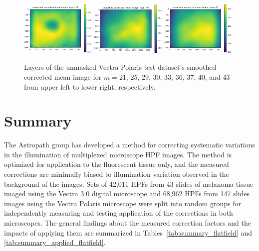 \documentclass[letterpaper,11pt]{article}
\begin{document}
\begin{figure}[!ht]
\includegraphics[width=0.32\textwidth]{images/results/unmasked_smoothed_corrected_mean_image_layers_polaris/smoothed_corrected_mean_image_layer_37}
\includegraphics[width=0.32\textwidth]{images/results/unmasked_smoothed_corrected_mean_image_layers_polaris/smoothed_corrected_mean_image_layer_40}
\includegraphics[width=0.32\textwidth]{images/results/unmasked_smoothed_corrected_mean_image_layers_polaris/smoothed_corrected_mean_image_layer_43}
\caption{\footnotesize Layers of the unmasked Vectra Polaris test dataset's smoothed corrected mean image for $m=$21, 25, 29, 30, 33, 36, 37, 40, and 43 from upper left to lower right, respectively.}
\label{fig:unmasked_smoothed_corrected_mean_image_layers_polaris_2}
\end{figure}

\clearpage

\section{Summary}
\label{sec:summary}

The Astropath group has developed a method for correcting systematic variations in the illumination of multiplexed microscope HPF images. The method is optimized for application to the fluorescent tissue only, and the measured corrections are minimally biased to illumination variation observed in the background of the images. Sets of 42,011 HPFs from 43 slides of melanoma tissue imaged using the Vectra 3.0 digital microscope and 68,962 HPFs from 147 slides images using the Vectra Polaris microscope were split into random groups for independently measuring and testing application of the corrections in both microscopes. The general findings about the measured correction factors and the impacts of applying them are summarized in Tables~\ref{tab:summary_flatfield} and \ref{tab:summary_applied_flatfield}. 
\end{document}
